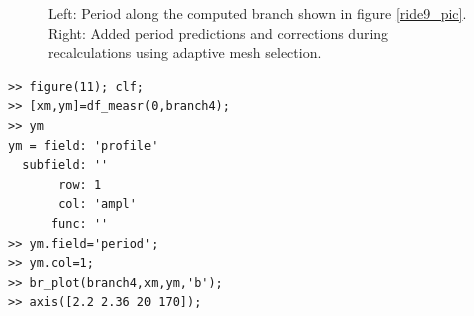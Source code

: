 \documentclass[10pt]{article}
\begin{document}
{\begin{figure}[h]
\begin{center}
\end{center}
\caption{\small\label{ride11_pic}Left: Period along the
computed branch shown in figure \ref{ride9_pic}. Right: Added period
predictions and corrections during recalculations using
adaptive mesh selection.} 
\end{figure}
{\small\begin{verbatim}
>> figure(11); clf;
>> [xm,ym]=df_measr(0,branch4);
>> ym
ym = field: 'profile'
  subfield: ''
       row: 1
       col: 'ampl'
      func: ''
>> ym.field='period';
>> ym.col=1;
>> br_plot(branch4,xm,ym,'b');
>> axis([2.2 2.36 20 170]);
\end{verbatim}}
\begin{figure}[h]
\begin{center}

\end{center}
\end{figure}}
\end{document}
